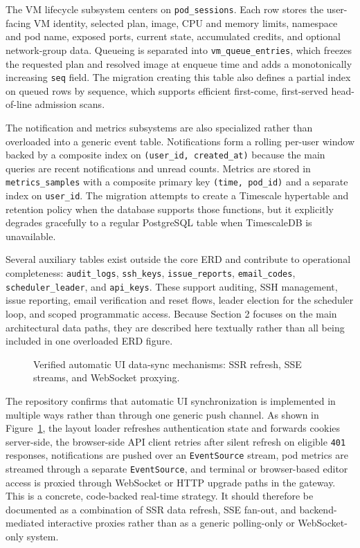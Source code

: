 \documentclass[12pt,a4paper]{article}
\begin{document}
The VM lifecycle subsystem centers on \texttt{pod\_sessions}. Each row stores the user-facing VM identity, selected plan, image, CPU and memory limits, namespace and pod name, exposed ports, current state, accumulated credits, and optional network-group data. Queueing is separated into \texttt{vm\_queue\_entries}, which freezes the requested plan and resolved image at enqueue time and adds a monotonically increasing \texttt{seq} field. The migration creating this table also defines a partial index on queued rows by sequence, which supports efficient first-come, first-served head-of-line admission scans.

The notification and metrics subsystems are also specialized rather than overloaded into a generic event table. Notifications form a rolling per-user window backed by a composite index on \texttt{(user\_id, created\_at)} because the main queries are recent notifications and unread counts. Metrics are stored in \texttt{metrics\_samples} with a composite primary key \texttt{(time, pod\_id)} and a separate index on \texttt{user\_id}. The migration attempts to create a Timescale hypertable and retention policy when the database supports those functions, but it explicitly degrades gracefully to a regular PostgreSQL table when TimescaleDB is unavailable.

Several auxiliary tables exist outside the core ERD and contribute to operational completeness: \texttt{audit\_logs}, \texttt{ssh\_keys}, \texttt{issue\_reports}, \texttt{email\_codes}, \texttt{scheduler\_leader}, and \texttt{api\_keys}. These support auditing, SSH management, issue reporting, email verification and reset flows, leader election for the scheduler loop, and scoped programmatic access. Because Section 2 focuses on the main architectural data paths, they are described here textually rather than all being included in one overloaded ERD figure.

\begin{figure}[!htbp]
    \centering
    \resizebox{\textwidth}{!}{}
    \caption{Verified automatic UI data-sync mechanisms: SSR refresh, SSE streams, and WebSocket proxying.}
    \label{fig:hopper-ui-sync}
\end{figure}

The repository confirms that automatic UI synchronization is implemented in multiple ways rather than through one generic push channel. As shown in Figure~\ref{fig:hopper-ui-sync}, the layout loader refreshes authentication state and forwards cookies server-side, the browser-side API client retries after silent refresh on eligible \texttt{401} responses, notifications are pushed over an \texttt{EventSource} stream, pod metrics are streamed through a separate \texttt{EventSource}, and terminal or browser-based editor access is proxied through WebSocket or HTTP upgrade paths in the gateway. This is a concrete, code-backed real-time strategy. It should therefore be documented as a combination of SSR data refresh, SSE fan-out, and backend-mediated interactive proxies rather than as a generic polling-only or WebSocket-only system.
\end{document}
